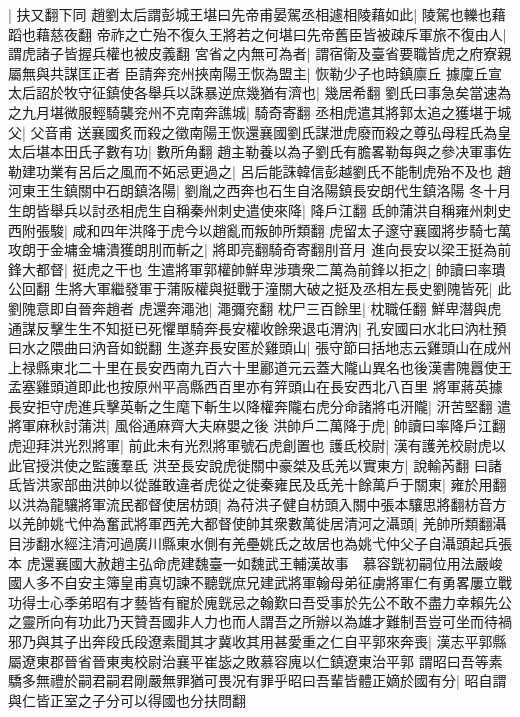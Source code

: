 |{
	扶又翻下同}
趙劉太后謂彭城王堪曰先帝甫晏駕丞相遽相陵藉如此|{
	陵駕也轢也藉蹈也藉慈夜翻}
帝祚之亡殆不復久王將若之何堪曰先帝舊臣皆被疎斥軍旅不復由人|{
	謂虎諸子皆握兵權也被皮義翻}
宮省之内無可為者|{
	謂宿衛及臺省要職皆虎之府寮親屬無與共謀匡正者}
臣請奔兖州挾南陽王恢為盟主|{
	恢勒少子也時鎮廪丘}
據廩丘宣太后詔於牧守征鎮使各舉兵以誅暴逆庶幾猶有濟也|{
	幾居希翻}
劉氏曰事急矣當速為之九月堪微服輕騎襲兖州不克南奔譙城|{
	騎奇寄翻}
丞相虎遣其將郭太追之獲堪于城父|{
	父音甫}
送襄國炙而殺之徵南陽王恢還襄國劉氏謀泄虎廢而殺之尊弘母程氏為皇太后堪本田氏子數有功|{
	數所角翻}
趙主勒養以為子劉氏有膽畧勒每與之參决軍事佐勒建功業有呂后之風而不妬忌更過之|{
	呂后能誅韓信彭越劉氏不能制虎殆不及也}
趙河東王生鎮關中石朗鎮洛陽|{
	劉胤之西奔也石生自洛陽鎮長安朗代生鎮洛陽}
冬十月生朗皆舉兵以討丞相虎生自稱秦州刺史遣使來降|{
	降戶江翻}
氐帥蒲洪自稱雍州刺史西附張駿|{
	咸和四年洪降于虎今以趙亂而叛帥所類翻}
虎留太子邃守襄國將步騎七萬攻朗于金墉金墉潰獲朗刖而斬之|{
	將即亮翻騎奇寄翻刖音月}
進向長安以梁王挺為前鋒大都督|{
	挺虎之干也}
生遣將軍郭權帥鮮卑涉璝衆二萬為前鋒以拒之|{
	帥讀曰率璝公回翻}
生將大軍繼發軍于蒲阪權與挺戰于潼關大破之挺及丞相左長史劉隗皆死|{
	此劉隗意即自晉奔趙者}
虎還奔澠池|{
	澠彌兖翻}
枕尸三百餘里|{
	枕職任翻}
鮮卑潛與虎通謀反擊生生不知挺已死懼單騎奔長安權收餘衆退屯渭汭|{
	孔安國曰水北曰汭杜預曰水之隈曲曰汭音如鋭翻}
生遂弃長安匿於雞頭山|{
	張守節曰括地志云雞頭山在成州上禄縣東北二十里在長安西南九百六十里酈道元云蓋大隴山異名也後漢書隗囂使王孟塞雞頭道即此也按原州平高縣西百里亦有笄頭山在長安西北八百里}
將軍蔣英據長安拒守虎進兵擊英斬之生麾下斬生以降權奔隴右虎分命諸將屯汧隴|{
	汧苦堅翻}
遣將軍麻秋討蒲洪|{
	風俗通麻齊大夫麻嬰之後}
洪帥戶二萬降于虎|{
	帥讀曰率降戶江翻}
虎迎拜洪光烈將軍|{
	前此未有光烈將軍號石虎創置也}
護氐校尉|{
	漢有護羌校尉虎以此官授洪使之監護羣氐}
洪至長安說虎徙關中豪桀及氐羌以實東方|{
	說輸芮翻}
曰諸氐皆洪家部曲洪帥以從誰敢違者虎從之徙秦雍民及氐羌十餘萬戶于關東|{
	雍於用翻}
以洪為龍驤將軍流民都督使居枋頭|{
	為苻洪子健自枋頭入關中張本驤思將翻枋音方}
以羌帥姚弋仲為奮武將軍西羌大都督使帥其衆數萬徙居清河之灄頭|{
	羌帥所類翻灄目涉翻水經注清河過廣川縣東水側有羌壘姚氏之故居也為姚弋仲父子自灄頭起兵張本}
虎還襄國大赦趙主弘命虎建魏臺一如魏武王輔漢故事　慕容皝初嗣位用法嚴峻國人多不自安主簿皇甫真切諫不聽皝庶兄建武將軍翰母弟征虜將軍仁有勇畧屢立戰功得士心季弟昭有才藝皆有寵於廆皝忌之翰歎曰吾受事於先公不敢不盡力幸賴先公之靈所向有功此乃天贊吾國非人力也而人謂吾之所辦以為雄才難制吾豈可坐而待禍邪乃與其子出奔段氏段遼素聞其才冀收其用甚愛重之仁自平郭來奔喪|{
	漢志平郭縣屬遼東郡晉省晉東夷校尉治襄平崔毖之敗慕容廆以仁鎮遼東治平郭}
謂昭曰吾等素驕多無禮於嗣君嗣君剛嚴無罪猶可畏况有罪乎昭曰吾輩皆體正嫡於國有分|{
	昭自謂與仁皆正室之子分可以得國也分扶問翻}
